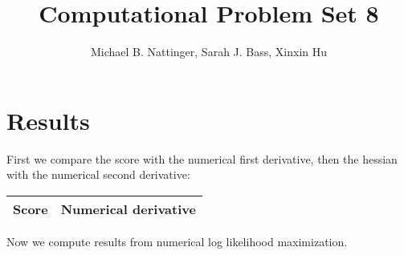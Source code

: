 \documentclass[11pt]{article} %
\title{Computational Problem Set 8}
\author{Michael B. Nattinger, Sarah J. Bass, Xinxin Hu}
\begin{document}
\maketitle
\section{Results}

First we compare the score with the numerical first derivative, then the hessian with the numerical second derivative:
\begin{center}
\begin{tabular}{|c|c|}
\hline 
Score & Numerical derivative \\
\hline \hline

\hline
\end{tabular}
\end{center}

\pagebreak

\begin{center}
\end{center}

\pagebreak

\begin{center}
\end{center}

\pagebreak

Now we compute results from numerical log likelihood maximization.

\begin{center}

\end{center}
\end{document}
